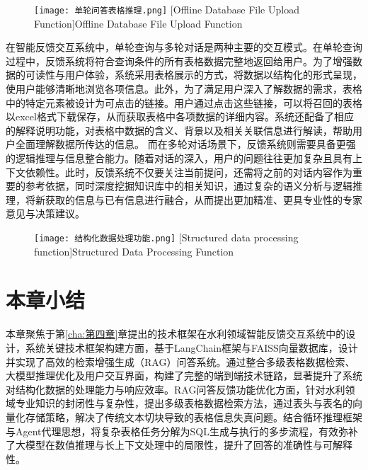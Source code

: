 \begin{figure}[htb]
    \centering
    \texttt{[image: 单轮问答表格推理.png]}
    [Offline Database File Upload Function]{Offline Database File Upload Function}
    \label{fig:单轮问答}
\end{figure}
在智能反馈交互系统中，单轮查询与多轮对话是两种主要的交互模式。在单轮查询过程中，反馈系统将符合查询条件的所有表格数据完整地返回给用户。为了增强数据的可读性与用户体验，系统采用表格展示的方式，将数据以结构化的形式呈现，使用户能够清晰地浏览各项信息。此外，为了满足用户深入了解数据的需求，表格中的特定元素被设计为可点击的链接。用户通过点击这些链接，可以将召回的表格以excel格式下载保存，从而获取表格中各项数据的详细内容。系统还配备了相应的解释说明功能，对表格中数据的含义、背景以及相关关联信息进行解读，帮助用户全面理解数据所传达的信息。
而在多轮对话场景下，反馈系统则需要具备更强的逻辑推理与信息整合能力。随着对话的深入，用户的问题往往更加复杂且具有上下文依赖性。此时，反馈系统不仅要关注当前提问，还需将之前的对话内容作为重要的参考依据，同时深度挖掘知识库中的相关知识，通过复杂的语义分析与逻辑推理，将新获取的信息与已有信息进行融合，从而提出更加精准、更具专业性的专家意见与决策建议。
\begin{figure}[ht]
    \centering
    \texttt{[image: 结构化数据处理功能.png]}
    [Structured data processing function]{Structured Data Processing Function}
    \label{fig:结构化数据}
\end{figure}


\section{本章小结}
本章聚焦于第\ref{cha:第四章}章提出的技术框架在水利领域智能反馈交互系统中的设计，系统关键技术框架构建方面，基于LangChain框架与FAISS向量数据库，设计并实现了高效的检索增强生成（RAG）问答系统。通过整合多级表格数据检索、大模型推理优化及用户交互界面，构建了完整的端到端技术链路，显著提升了系统对结构化数据的处理能力与响应效率。RAG问答反馈功能优化方面，针对水利领域专业知识的封闭性与复杂性，提出多级表格数据检索方法，通过表头与表名的向量化存储策略，解决了传统文本切块导致的表格信息失真问题。结合循环推理框架与Agent代理思想，将复杂表格任务分解为SQL生成与执行的多步流程，有效弥补了大模型在数值推理与长上下文处理中的局限性，提升了回答的准确性与可解释性。

